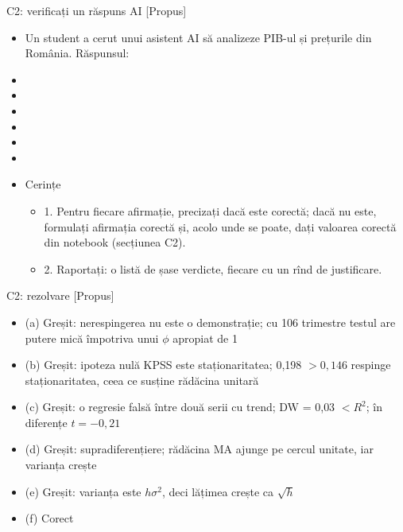 \begin{frame}{C2: verificați un răspuns AI [Propus]}
\itemsize{\scriptsize}
\begin{itemize}
    \item Un student a cerut unui asistent AI să analizeze PIB-ul și prețurile din România. Răspunsul:
    \item {}
    \item {}
    \item {}
    \item {}
    \item {}
    \item {}
    \item Cerințe
    \begin{itemize}
        \item 1. Pentru fiecare afirmație, precizați dacă este corectă; dacă nu este, formulați afirmația corectă și, acolo unde se poate, dați valoarea corectă din notebook (secțiunea C2).
        \item 2. Raportați: o listă de șase verdicte, fiecare cu un rînd de justificare.
    \end{itemize}
\end{itemize}
\end{frame}

\ifsolutions
\begin{frame}{C2: rezolvare [Propus]}
\itemsize{\scriptsize}
\begin{itemize}
    \item (a) Greșit: nerespingerea nu este o demonstrație; cu 106 trimestre testul are putere mică împotriva unui $\phi$ apropiat de 1
    \item (b) Greșit: ipoteza nulă KPSS este staționaritatea; 0{,}198 $> 0{,}146$ respinge staționaritatea, ceea ce susține rădăcina unitară
    \item (c) Greșit: o regresie falsă între două serii cu trend; DW = 0{,}03 $< R^2$; în diferențe $t = -0{,}21$
    \item (d) Greșit: supradiferențiere; rădăcina MA ajunge pe cercul unitate, iar varianța crește
    \item (e) Greșit: varianța este $h\sigma^2$, deci lățimea crește ca $\sqrt{h}$
    \item (f) Corect
\end{itemize}
\end{frame}
\fi


